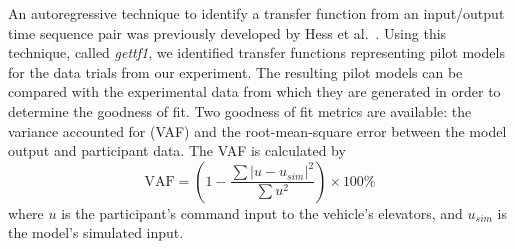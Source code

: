 An autoregressive technique to identify a transfer function from an input/output time sequence pair was previously developed by Hess et al.~\citet{hess_modeling_2002}.
Using this technique, called \textit{gettf1}, we identified transfer functions representing pilot models for the data trials from our experiment.
The resulting pilot models can be compared with the experimental data from which they are generated in order to determine the goodness of fit.
Two goodness of fit metrics are available: the variance accounted for (VAF) and the root-mean-square error between the model output and participant data.
The VAF is calculated by
\begin{equation}
    \mbox{VAF} = \left( 1 - \dfrac{\sum{|u - u_{sim}|^2}} {\sum{u^2}} \right) \times \mbox{100\%}
\end{equation}
where $u$ is the participant's command input to the vehicle's elevators, and $u_{sim}$ is the model's simulated input.


